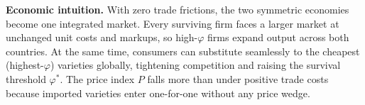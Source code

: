\begin{solution}
\bigskip
	\textbf{Economic intuition.}
With zero trade frictions, the two symmetric economies become one integrated market. Every surviving firm faces a larger market at unchanged unit costs and markups, so high-$\varphi$ firms expand output across both countries. At the same time, consumers can substitute seamlessly to the cheapest (highest-$\varphi$) varieties globally, tightening competition and raising the survival threshold $\varphi^*$. The price index $P$ falls more than under positive trade costs because imported varieties enter one-for-one without any price wedge.

\medskip
\noindent{}
\end{solution}